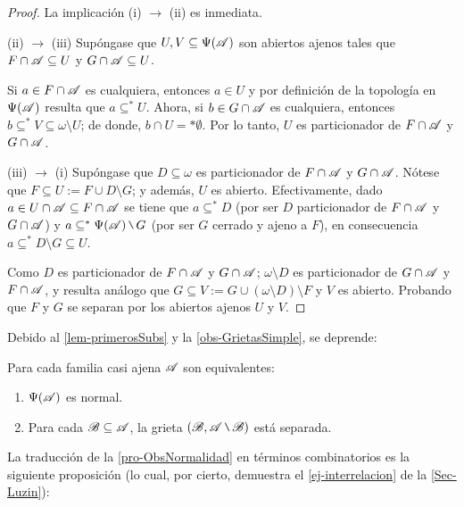     \begin{proof}
        La implicación (i) $\to$ (ii) es inmediata.

        (ii) $\to$ (iii) Supóngase que $U,V \subseteq \Psi(\mathscr{A})$ son abiertos ajenos tales que $F \cap \mathscr{A} \subseteq U$ y $G \cap \mathscr{A} \subseteq U$.
        
        Si $a \in F \cap \mathscr{A}$ es cualquiera, entonces $a \in U$ y por definición de la topología en $\Psi(\mathscr{A})$ resulta que $a \subseteq^* U$. Ahora, si $b \in G \cap \mathscr{A}$ es cualquiera, entonces $b \subseteq^* V \subseteq \omega \setminus U$; de donde, $b \cap U =* \emptyset$. Por lo tanto, $U$ es particionador de $F \cap \mathscr{A}$ y $G \cap \mathscr{A}$.

        (iii) $\to$ (i) Supóngase que $D \subseteq \omega$ es particionador de $F \cap \mathscr{A}$ y $G \cap \mathscr{A}$. Nótese que $F \subseteq U:=F \cup D\setminus G$; y además, $U$ es abierto. Efectivamente, dado $a \in U \cap \mathscr{A} \subseteq F \cap \mathscr{A}$ se tiene que $a \subseteq^* D$ (por ser $D$ particionador de $F \cap \mathscr{A}$ y $G \cap \mathscr{A}$) y $a \subseteq^* \Psi(\ms{A}) \setminus G$ (por ser $G$ cerrado y ajeno a $F$), en consecuencia $a \subseteq^* D\setminus G \subseteq U$.

        Como $D$ es particionador de $F \cap \mathscr{A}$ y $G \cap \mathscr{A}$; $\omega \setminus D$ es particionador de $G\cap \mathscr{A}$ y $F \cap \mathscr{A}$, y resulta análogo que $G \subseteq V:=G \cup (\omega \setminus D)\setminus F$ y $V$ es abierto. Probando que $F$ y $G$ se separan por los abiertos ajenos $U$ y $V$.
    \end{proof}

    Debido al \autoref{lem-primerosSubs} y la \autoref{obs-GrietasSimple}, se deprende:

    \begin{corolario}\label{cor-tra-NormalParticionador}
        Para cada familia casi ajena $\mathscr{A}$ son equivalentes:
        \begin{enumerate}
            \item $\Psi(\mathscr{A})$ es normal.
            \item Para cada $\mathscr{B} \subseteq \mathscr{A}$, la grieta $(\ms{B},\ms{A} \setminus \ms{B})$ está separada.
        \end{enumerate}
    \end{corolario}

    La traducción de la \autoref{pro-ObsNormalidad} en términos combinatorios es la siguiente proposición (lo cual, por cierto, demuestra el \autoref{ej-interrelacion} de la \autoref{Sec-Luzin}):

